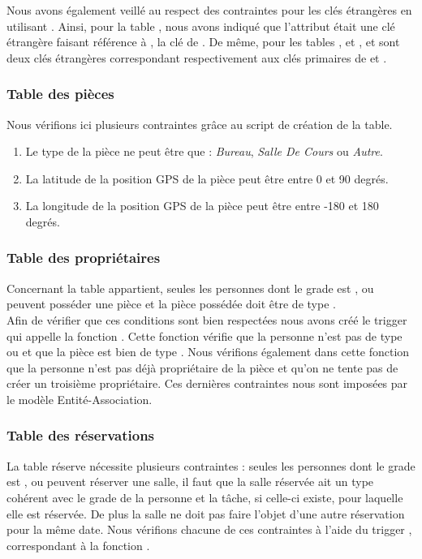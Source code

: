 	Nous avons également veillé au respect des contraintes pour les clés étrangères en utilisant . Ainsi, pour la table , nous avons indiqué que l'attribut  était une clé étrangère faisant référence à , la clé de . De même, pour les tables ,  et ,  et  sont deux clés étrangères correspondant respectivement aux clés primaires de  et .\\

\subsubsection{Table des pièces}
	Nous vérifions ici plusieurs contraintes grâce au script de création de la table.
	\begin{enumerate}
		\item Le type de la pièce ne peut être que : \textit{Bureau}, \textit{Salle De Cours} ou \textit{Autre}.
		\item La latitude de la position GPS de la pièce peut être entre 0 et 90 degrés.
		\item La longitude de la position GPS de la pièce peut être entre -180 et 180 degrés.
	\end{enumerate}

\subsubsection{Table des propriétaires}
	Concernant la table appartient, seules les personnes dont le grade est ,  ou  peuvent posséder une pièce et la pièce possédée doit être de type .\\

	Afin de vérifier que ces conditions sont bien respectées nous avons créé le trigger  qui appelle la fonction . Cette fonction vérifie que la personne n'est pas de type  ou  et que la pièce est bien de type . Nous vérifions également dans cette fonction que la personne n'est pas déjà propriétaire de la pièce et qu'on ne tente pas de créer un troisième propriétaire. Ces dernières contraintes nous sont imposées par le modèle Entité-Association.

\subsubsection{Table des réservations}
	La table réserve nécessite plusieurs contraintes : seules les personnes dont le grade est ,  ou  peuvent réserver une salle, il faut que la salle réservée ait un type cohérent avec le grade de la personne et la tâche, si celle-ci existe, pour laquelle elle est réservée. De plus la salle ne doit pas faire l'objet d'une autre réservation pour la même date. Nous vérifions chacune de ces contraintes à l'aide du trigger , correspondant à la fonction .\\

